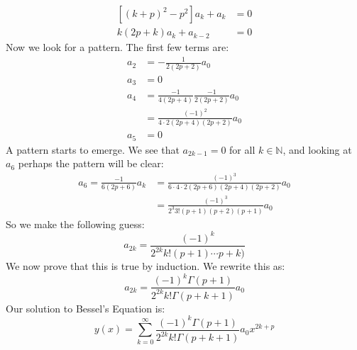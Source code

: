 \documentclass[crop=false,class=book,oneside]{standalone}
\begin{document}
        \begin{subequations}
            \begin{align}
                [(k+p)^{2}-p^{2}]a_{k}+a_{k}&=0\\
                k(2p+k)a_{k}+a_{k-2}&=0
            \end{align}
        \end{subequations}
        Now we look for a pattern. The first few terms are:
        \begin{subequations}
            \begin{align}
                a_{2}&=\minus\frac{1}{2(2p+2)}a_{0}\\
                a_{3}&=0\\
                a_{4}&=\frac{\minus{1}}{4(2p+4)}
                    \frac{\minus{1}}{2(2p+2)}a_{0}\\
                &=\frac{(\minus{1})^{2}}{4\cdot{2}(2p+4)(2p+2)}a_{0}\\
                a_{5}&=0
            \end{align}
        \end{subequations}
        A pattern starts to emerge. We see that $a_{2k-1}=0$ for
        all $k\in\mathbb{N}$, and looking at $a_{6}$ perhaps the
        pattern will be clear:
        \begin{subequations}
            \begin{align}
                a_{6}=\frac{\minus{1}}{6(2p+6)}a_{k}&=
                \frac{(\minus{1})^{3}}
                    {6\cdot{4}\cdot{2}(2p+6)(2p+4)(2p+2)}a_{0}\\
                &=\frac{(\minus{1})^{3}}{2^{3}3!(p+1)(p+2)(p+1)}a_{0}
            \end{align}
        \end{subequations}
        So we make the following guess:
        \begin{equation}
            a_{2k}=\frac{(\minus{1})^{k}}{2^{2k}k!(p+1)\cdots{p+k)}}
        \end{equation}
        We now prove that this is true by induction.
        We rewrite this as:
        \begin{equation}
            a_{2k}=
            \frac{(\minus{1})^{k}\Gamma(p+1)}
                {2^{2k}k!\Gamma(p+k+1)}a_{0}
        \end{equation}
        Our solution to Bessel's Equation is:
        \begin{equation}
            y(x)=\sum_{k=0}^{\infty}
                \frac{(\minus{1})^{k}\Gamma(p+1)}
                    {2^{2k}k!\Gamma(p+k+1)}a_{0}x^{2k+p}
        \end{equation}
\end{document}
